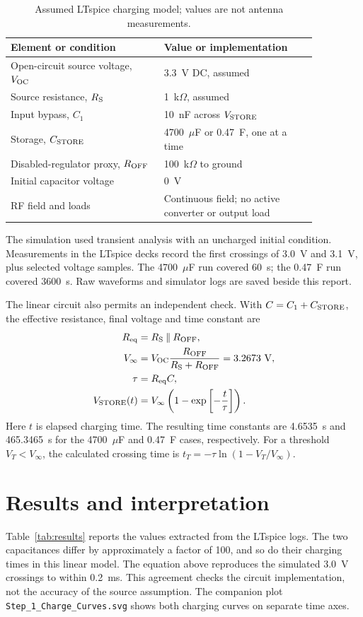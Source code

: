 \documentclass[11pt,a4paper]{article}
\begin{document}
\begin{table}[htbp]
\centering
\caption{Assumed LTspice charging model; values are not antenna measurements.}
\label{tab:model}
\begin{tabular}{p{0.43\linewidth}p{0.43\linewidth}}
\toprule
Element or condition & Value or implementation \\
\midrule
Open-circuit source voltage, $V_{\rm OC}$ & 3.3~V DC, assumed \\
Source resistance, $R_{\rm S}$ & 1~k$\Omega$, assumed \\
Input bypass, $C_1$ & 10~nF across $V_{\rm STORE}$ \\
Storage, $C_{\rm STORE}$ & 4700~$\mu$F or 0.47~F, one at a time \\
Disabled-regulator proxy, $R_{\rm OFF}$ & 100~k$\Omega$ to ground \\
Initial capacitor voltage & 0~V \\
RF field and loads & Continuous field; no active converter or output load \\
\bottomrule
\end{tabular}
\end{table}

The simulation used transient analysis with an uncharged initial condition. Measurements in the LTspice decks record the first crossings of 3.0~V and 3.1~V, plus selected voltage samples. The 4700~$\mu$F run covered 60~s; the 0.47~F run covered 3600~s. Raw waveforms and simulator logs are saved beside this report.

The linear circuit also permits an independent check. With $C=C_1+C_{\rm STORE}$, the effective resistance, final voltage and time constant are
\begin{align}
R_{\rm eq} &= R_{\rm S}\mathbin{\|}R_{\rm OFF}, \\
V_{\infty} &= V_{\rm OC}\frac{R_{\rm OFF}}{R_{\rm S}+R_{\rm OFF}}=3.2673~\mathrm{V}, \\
\tau &= R_{\rm eq}C, \\
V_{\rm STORE}(t) &= V_{\infty}\left(1-\exp\left[-\frac{t}{\tau}\right]\right).
\end{align}
Here $t$ is elapsed charging time. The resulting time constants are 4.6535~s and 465.3465~s for the 4700~$\mu$F and 0.47~F cases, respectively. For a threshold $V_T<V_{\infty}$, the calculated crossing time is $t_T=-\tau\ln(1-V_T/V_{\infty})$.

\section{Results and interpretation}
Table~\ref{tab:results} reports the values extracted from the LTspice logs. The two capacitances differ by approximately a factor of 100, and so do their charging times in this linear model. The equation above reproduces the simulated 3.0~V crossings to within 0.2~ms. This agreement checks the circuit implementation, not the accuracy of the source assumption. The companion plot \texttt{Step\_1\_Charge\_Curves.svg} shows both charging curves on separate time axes.
\end{document}
